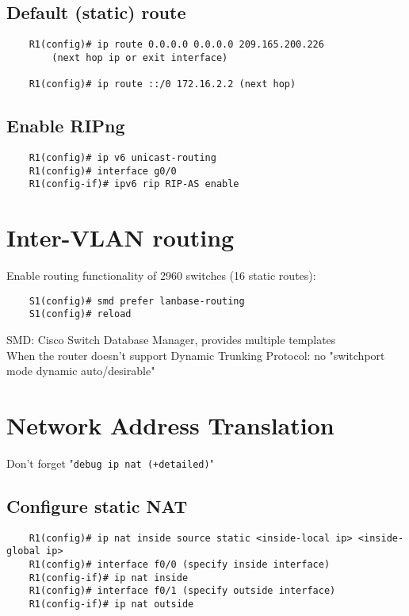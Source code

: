 \documentclass[10pt, a4paper]{article}
\begin{document}
	\subsection{Default (static) route}
	\begin{lstlisting}
	R1(config)# ip route 0.0.0.0 0.0.0.0 209.165.200.226 
		(next hop ip or exit interface)
	
	R1(config)# ip route ::/0 172.16.2.2 (next hop)
	\end{lstlisting}
	
	\subsection{Enable RIPng}
	\begin{lstlisting}
	R1(config)# ip v6 unicast-routing
	R1(config)# interface g0/0
	R1(config-if)# ipv6 rip RIP-AS enable
	\end{lstlisting}
	
	\section{Inter-VLAN routing}
	Enable routing functionality of 2960 switches (16 static routes):\\
	\begin{lstlisting}
	S1(config)# smd prefer lanbase-routing
	S1(config)# reload
	\end{lstlisting}
	SMD: Cisco Switch Database Manager, provides multiple templates\\
	When the router doesn't support Dynamic Trunking Protocol: no "switchport mode dynamic auto/desirable"
	
	\section{Network Address Translation}
	Don't forget "\texttt{debug ip nat (+detailed)}"
	\subsection{Configure static NAT}
	\begin{lstlisting}
	R1(config)# ip nat inside source static <inside-local ip> <inside-global ip>
	R1(config)# interface f0/0 (specify inside interface)
	R1(config-if)# ip nat inside
	R1(config)# interface f0/1 (specify outside interface)
	R1(config-if)# ip nat outside
	\end{lstlisting}
	
\end{document}
